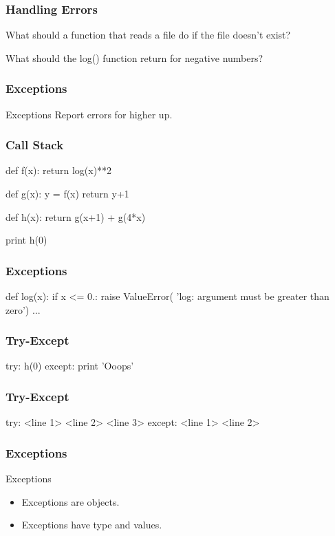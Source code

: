 \begin{frame}[fragile]
\frametitle{Handling Errors}

What should a function that reads a file do if the file doesn't exist?

What should the log() function return for negative numbers?
\end{frame}

\begin{frame}[fragile]
\frametitle{Exceptions}

\begin{block}{Exceptions}
Report errors for higher up.
\end{block}

\end{frame}

\begin{frame}[fragile]
\frametitle{Call Stack}
\begin{python}
def f(x):
    return log(x)**2

def g(x):
    y = f(x)
    return y+1

def h(x):
    return g(x+1) + g(4*x)

print h(0)
\end{python}
\end{frame}

\begin{frame}[fragile]
\frametitle{Exceptions}

\begin{python}
def log(x):
    if x <= 0.:
        raise ValueError(
            'log: argument must be greater than zero')
    ...
\end{python}
\end{frame}

\begin{frame}[fragile]
\frametitle{Try-Except}

\begin{python}
try:
    h(0)
except:
    print 'Ooops'
\end{python}
\end{frame}

\begin{frame}[fragile]
\frametitle{Try-Except}

\begin{python}
try:
    <line 1>
    <line 2>
    <line 3>
except:
    <line 1>
    <line 2>
\end{python}
\end{frame}

\begin{frame}[fragile]
\frametitle{Exceptions}

\begin{block}{Exceptions}
\begin{itemize}
\item Exceptions are \alert{objects}.
\item Exceptions have \alert{type} and \alert{values}.
\end{itemize}
\end{block}
\end{frame}

